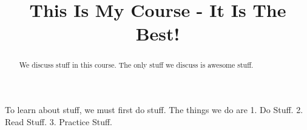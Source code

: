 \documentclass{xourse}
\title{This Is My Course - It Is The Best!}
\begin{document}
\begin{abstract}
We discuss stuff in this course. The only stuff we discuss is awesome stuff.
\end{abstract}
\maketitle

To learn about stuff, we must first do stuff. The things we do are
1. Do Stuff.
2. Read Stuff.
3. Practice Stuff.

\end{document}
